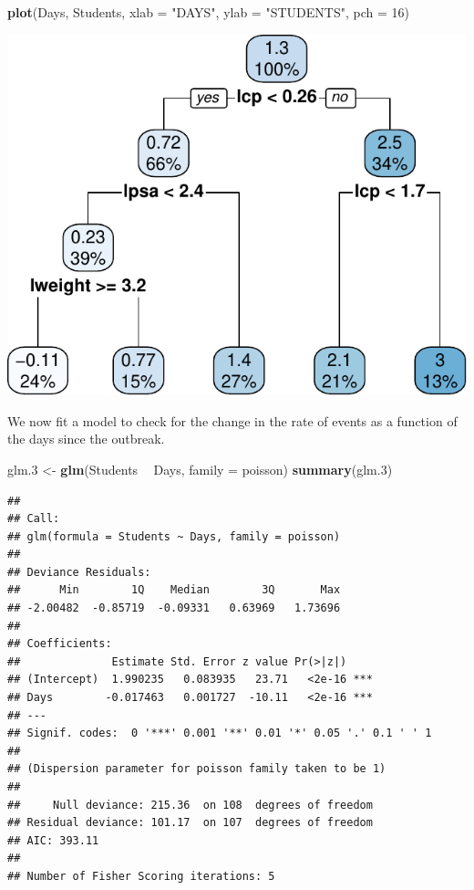 \documentclass[]{book}
\newenvironment{Shaded}{\begin{snugshade}}{\end{snugshade}}
\newcommand{\DataTypeTok}[1]{\textcolor[rgb]{0.13,0.29,0.53}{#1}}
\newcommand{\DecValTok}[1]{\textcolor[rgb]{0.00,0.00,0.81}{#1}}
\newcommand{\FloatTok}[1]{\textcolor[rgb]{0.00,0.00,0.81}{#1}}
\newcommand{\KeywordTok}[1]{\textcolor[rgb]{0.13,0.29,0.53}{\textbf{#1}}}
\newcommand{\NormalTok}[1]{#1}
\newcommand{\OperatorTok}[1]{\textcolor[rgb]{0.81,0.36,0.00}{\textbf{#1}}}
\newcommand{\StringTok}[1]{\textcolor[rgb]{0.31,0.60,0.02}{#1}}
\theoremstyle{definition}
\theoremstyle{definition}
\theoremstyle{definition}
\theoremstyle{remark}
\begin{document}
\begin{Shaded}
\begin{Highlighting}[]
\KeywordTok{plot}\NormalTok{(Days, Students, }\DataTypeTok{xlab =} \StringTok{"DAYS"}\NormalTok{, }\DataTypeTok{ylab =} \StringTok{"STUDENTS"}\NormalTok{, }\DataTypeTok{pch =} \DecValTok{16}\NormalTok{)}
\end{Highlighting}
\end{Shaded}

\includegraphics[width=0.5\linewidth]{Rcourse_files/figure-latex/unnamed-chunk-193-1}

We now fit a model to check for the change in the rate of events as a function of the days since the outbreak.

\begin{Shaded}
\begin{Highlighting}[]
\NormalTok{glm}\FloatTok{.3}\NormalTok{ <-}\StringTok{ }\KeywordTok{glm}\NormalTok{(Students }\OperatorTok{~}\StringTok{ }\NormalTok{Days, }\DataTypeTok{family =}\NormalTok{ poisson)}
\KeywordTok{summary}\NormalTok{(glm}\FloatTok{.3}\NormalTok{)}
\end{Highlighting}
\end{Shaded}

\begin{verbatim}
## 
## Call:
## glm(formula = Students ~ Days, family = poisson)
## 
## Deviance Residuals: 
##      Min        1Q    Median        3Q       Max  
## -2.00482  -0.85719  -0.09331   0.63969   1.73696  
## 
## Coefficients:
##              Estimate Std. Error z value Pr(>|z|)    
## (Intercept)  1.990235   0.083935   23.71   <2e-16 ***
## Days        -0.017463   0.001727  -10.11   <2e-16 ***
## ---
## Signif. codes:  0 '***' 0.001 '**' 0.01 '*' 0.05 '.' 0.1 ' ' 1
## 
## (Dispersion parameter for poisson family taken to be 1)
## 
##     Null deviance: 215.36  on 108  degrees of freedom
## Residual deviance: 101.17  on 107  degrees of freedom
## AIC: 393.11
## 
## Number of Fisher Scoring iterations: 5
\end{verbatim}
\end{document}
